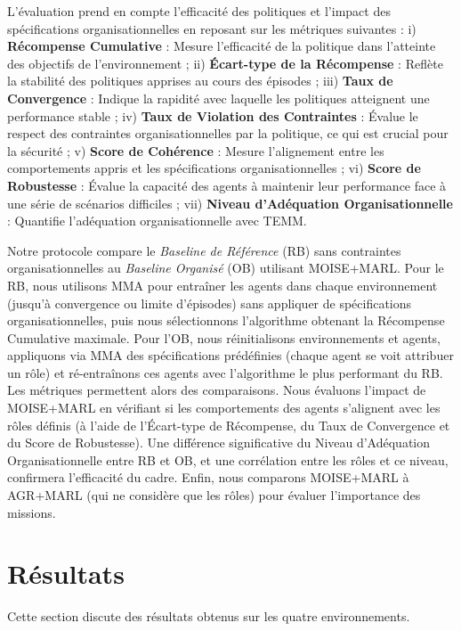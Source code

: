 \documentclass[final]{jfsma}
\begin{document}
L'évaluation prend en compte l'efficacité des politiques et l'impact des spécifications organisationnelles en reposant sur les métriques suivantes :
%
i) \textbf{Récompense Cumulative} : Mesure l'efficacité de la politique dans l'atteinte des objectifs de l'environnement
; \quad
ii) \textbf{Écart-type de la Récompense} : Reflète la stabilité des politiques apprises au cours des épisodes
; \quad
iii) \textbf{Taux de Convergence} : Indique la rapidité avec laquelle les politiques atteignent une performance stable
; \quad
iv) \textbf{Taux de Violation des Contraintes} : Évalue le respect des contraintes organisationnelles par la politique, ce qui est crucial pour la sécurité
; \quad
v) \textbf{Score de Cohérence} : Mesure l'alignement entre les comportements appris et les spécifications organisationnelles
; \quad
vi) \textbf{Score de Robustesse} : Évalue la capacité des agents à maintenir leur performance face à une série de scénarios difficiles
; \quad
vii) \textbf{Niveau d'Adéquation Organisationnelle} : Quantifie l'adéquation organisationnelle avec TEMM.

Notre protocole compare le \textit{Baseline de Référence} (RB) sans contraintes organisationnelles au \textit{Baseline Organisé} (OB) utilisant MOISE+MARL.
Pour le RB, nous utilisons MMA pour entraîner les agents dans chaque environnement (jusqu'à convergence ou limite d'épisodes) sans appliquer de spécifications organisationnelles, puis nous sélectionnons l'algorithme obtenant la Récompense Cumulative maximale.
Pour l'OB, nous réinitialisons environnements et agents, appliquons via MMA des spécifications prédéfinies (chaque agent se voit attribuer un rôle) et ré-entraînons ces agents avec l'algorithme le plus performant du RB. Les métriques permettent alors des comparaisons.
%
Nous évaluons l'impact de MOISE+MARL en vérifiant si les comportements des agents s'alignent avec les rôles définis (à l'aide de l'Écart-type de Récompense, du Taux de Convergence et du Score de Robustesse). Une différence significative du Niveau d'Adéquation Organisationnelle entre RB et OB, et une corrélation entre les rôles et ce niveau, confirmera l'efficacité du cadre.
Enfin, nous comparons MOISE+MARL à AGR+MARL (qui ne considère que les rôles) pour évaluer l'importance des missions.

\section{Résultats}
\label{sec:results}

Cette section discute des résultats obtenus sur les quatre environnements.
\end{document}
